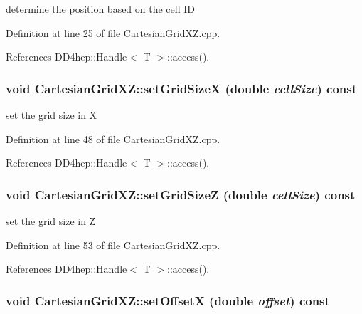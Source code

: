 determine the position based on the cell ID 

Definition at line 25 of file CartesianGridXZ.cpp.

References DD4hep::Handle$<$ T $>$::access().\hypertarget{class_d_d4hep_1_1_geometry_1_1_cartesian_grid_x_z_a58b8f64a7b2e3e7bb917f4a38a441464}{
\subsubsection[{setGridSizeX}]{\setlength{\rightskip}{0pt plus 5cm}void CartesianGridXZ::setGridSizeX (double {\em cellSize}) const}}
\label{class_d_d4hep_1_1_geometry_1_1_cartesian_grid_x_z_a58b8f64a7b2e3e7bb917f4a38a441464}


set the grid size in X 

Definition at line 48 of file CartesianGridXZ.cpp.

References DD4hep::Handle$<$ T $>$::access().\hypertarget{class_d_d4hep_1_1_geometry_1_1_cartesian_grid_x_z_a343c4fbce4c2a9d05db04720f102f5a5}{
\subsubsection[{setGridSizeZ}]{\setlength{\rightskip}{0pt plus 5cm}void CartesianGridXZ::setGridSizeZ (double {\em cellSize}) const}}
\label{class_d_d4hep_1_1_geometry_1_1_cartesian_grid_x_z_a343c4fbce4c2a9d05db04720f102f5a5}


set the grid size in Z 

Definition at line 53 of file CartesianGridXZ.cpp.

References DD4hep::Handle$<$ T $>$::access().\hypertarget{class_d_d4hep_1_1_geometry_1_1_cartesian_grid_x_z_a69229e9f2c58e33b5582f7e49af39bf9}{
\subsubsection[{setOffsetX}]{\setlength{\rightskip}{0pt plus 5cm}void CartesianGridXZ::setOffsetX (double {\em offset}) const}}
\label{class_d_d4hep_1_1_geometry_1_1_cartesian_grid_x_z_a69229e9f2c58e33b5582f7e49af39bf9}


